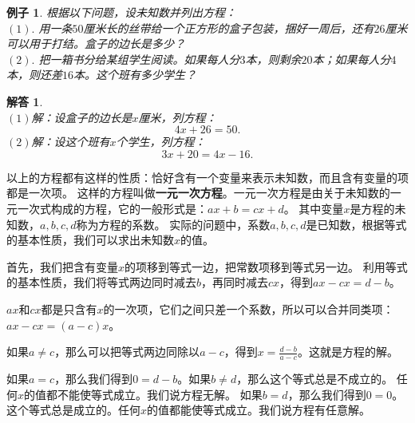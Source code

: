 \documentclass[12pt,UTF8]{ctexbook}
\newtheorem{ex}{例子}[section]
\newtheorem*{so}{解答}
\begin{document}
\begin{ex}\label{ex:4-0-0}
    根据以下问题，设未知数并列出方程：\\
    $(1).$ 用一条$50$厘米长的丝带给一个正方形的盒子包装，捆好一周后，还有$26$厘米可以用于打结。盒子的边长是多少？\\
    $(2).$ 把一箱书分给某组学生阅读。如果每人分$3$本，则剩余$20$本；如果每人分$4$本，则还差$16$本。这个班有多少学生？
\end{ex}
\begin{so}
    \mbox{} \\
    $(1)$解：设盒子的边长是$x$厘米，列方程：
    $$ 4x + 26 = 50.$$
    $(2)$解：设这个班有$x$个学生，列方程：
    $$ 3x + 20 = 4x - 16.$$
\end{so}
以上的方程都有这样的性质：恰好含有一个变量来表示未知数，而且含有变量的项都是一次项。
这样的方程叫做\textbf{一元一次方程}。一元一次方程是由关于未知数的一元一次式构成的方程，它的一般形式是：$ax+b=cx+d$。
其中变量$x$是方程的未知数，$a,b,c,d$称为方程的系数。
实际的问题中，系数$a,b,c,d$是已知数，根据等式的基本性质，我们可以求出未知数$x$的值。

首先，我们把含有变量$x$的项移到等式一边，把常数项移到等式另一边。
利用等式的基本性质，我们将等式两边同时减去$b$，再同时减去$cx$，得到$ax-cx=d-b$。

$ax$和$cx$都是只含有$x$的一次项，它们之间只差一个系数，所以可以合并同类项：$ax - cx = (a - c)x$。

如果$a\neq c$，那么可以把等式两边同除以$a-c$，得到$x = \frac{d-b}{a-c}$。这就是方程的解。

如果$a = c$，那么我们得到$0 = d-b$。如果$b\neq d$，那么这个等式总是不成立的。
任何$x$的值都不能使等式成立。我们说方程无解。
如果$b = d$，那么我们得到$0 = 0$。这个等式总是成立的。任何$x$的值都能使等式成立。我们说方程有任意解。
\end{document}

